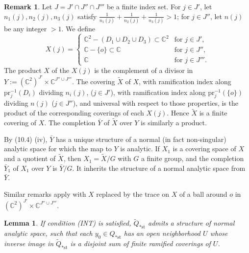 \documentclass[12pt,a4paper]{article}
\theoremstyle{plain}
\newtheorem{lemma}[theorem]{Lemma}
\theoremstyle{definition}
\newtheorem{remark}[theorem]{Remark}
\theoremstyle{remark}
\begin{document}
\begin{remark}
\label{10.5}
Let $J = J' \cap J'' \cap J'''$ be a finite index set. For $j \in J'$, let $n_1(j), n_2(j), n_3(j)$ satisfy $\frac{1}{n_1(j)} + \frac{1}{n_2(j)} + \frac{1}{n_3(j)} > 1$; for $j \in J''$, let $n(j)$ be any integer $> 1$. We define
\[
X(j) = \begin{cases}
\mathbb{C}^2 - (D_1 \cup D_2 \cup D_3) \subset \mathbb{C}^2 & \text{for } j \in J', \\
\mathbb{C} - \{o\} \subset \mathbb{C} & \text{for } j \in J'', \\
\mathbb{C} & \text{for } j \in J'''.\end{cases}
\]
The product $X$ of the $X(j)$ is the complement of a divisor in $Y := (\mathbb{C}^2)^{J'} \times \mathbb{C}^{J'' \cup J'''}$. The covering $\widetilde{X}$ of $X$, with ramification index along $\text{pr}_j^{-1}(D_i)$ dividing $n_i(j)$, ($j \in J'$), with ramification index along $\text{pr}_j^{-1}(\{o\})$ dividing $n(j)$ ($j \in J''$), and universal with respect to those properties, is the product of the corresponding coverings of each $X(j)$. Hence $\widetilde{X}$ is a finite covering of $X$. The completion $\bar{Y}$ of $\widetilde{X}$ over $Y$ is similarly a product.

By (10.4) (iv), $\bar{Y}$ has a unique structure of a normal (in fact non-singular) analytic space for which the map to $Y$ is analytic. If $X_1$ is a covering space of $X$ and a quotient of $\widetilde{X}$, then $X_1 = \widetilde{X}/G$ with $G$ a finite group, and the completion $\bar{Y}_1$ of $X_1$ over $Y$ is $\bar{Y}/G$. It inherits the structure of a normal analytic space from $\bar{Y}$.

Similar remarks apply with $X$ replaced by the trace on $X$ of a ball around $o$ in $(\mathbb{C}^2)^{J'} \times \mathbb{C}^{J'' \cup J'''}$.
\end{remark}

\begin{lemma}
\label{10.6}
If condition (INT) is satisfied, $\widetilde{Q}_{*\text{st}}$ admits a structure of normal analytic space, such that each $y_0 \in Q_{*\text{st}}$ has an open neighborhood $U$ whose inverse image in $\widetilde{Q}_{*\text{st}}$ is a disjoint sum of finite ramified coverings of $U$.
\end{lemma}
\end{document}
